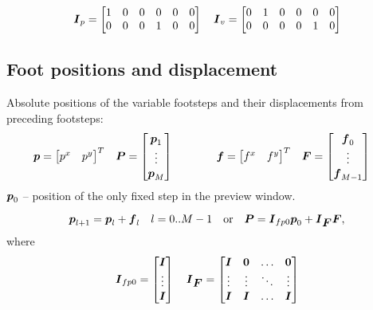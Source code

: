 \documentclass[12pt,a4paper]{article}
\begin{document}
\begin{equation*}
\mbox{\boldmath $I$}_{p} = 
\begin{bmatrix} 
    1 & 0 & 0 & 0 & 0 & 0 \\
    0 & 0 & 0 & 1 & 0 & 0 
\end{bmatrix}
\quad
\mbox{\boldmath $I$}_{v} = 
\begin{bmatrix} 
    0 & 1 & 0 & 0 & 0 & 0 \\
    0 & 0 & 0 & 0 & 1 & 0 
\end{bmatrix}
\end{equation*}



\subsection{Foot positions and displacement}
Absolute positions of the variable footsteps and their displacements from
preceding footsteps:
\begin{align*}
\mbox{\boldmath $p$} = \begin{bmatrix} p^x & p^y \end{bmatrix}^T
\quad &
\mbox{\boldmath $P$} = \begin{bmatrix} \mbox{\boldmath $p$}_1 \\ \vdots \\ \mbox{\boldmath $p$}_M \end{bmatrix}
\quad\quad\quad&
\mbox{\boldmath $f$} = \begin{bmatrix} f^x & f^y \end{bmatrix}^T
\quad &
\mbox{\boldmath $F$} = \begin{bmatrix} \mbox{\boldmath $f$}_0 \\ \vdots \\ \mbox{\boldmath $f$}_{M-1} \end{bmatrix}
\end{align*}
$\mbox{\boldmath $p$}_0$ -- position of the only fixed step in the preview window.


\begin{equation*}
    \mbox{\boldmath $p$}_{l+1} = \mbox{\boldmath $p$}_l + \mbox{\boldmath $f$}_{l}
    \quad
    l = 0..M-1
    \quad
    \mbox{or}
    \quad
    \mbox{\boldmath $P$} = 
    \mbox{\boldmath $I$}_{fp0}
    \mbox{\boldmath $p$}_0 
    + 
    \mbox{\boldmath $I$}_{\mbox{\boldmath $F$}}
    \mbox{\boldmath $F$},
\end{equation*}
where
\begin{equation*}
    \mbox{\boldmath $I$}_{fp0} = 
    \begin{bmatrix}
        \mbox{\boldmath $I$}\\
        \vdots\\
        \mbox{\boldmath $I$}\\
    \end{bmatrix}
    \quad
    \mbox{\boldmath $I$}_{\mbox{\boldmath $F$}} = 
    \begin{bmatrix}
        \mbox{\boldmath $I$}   &   \mbox{\boldmath $0$}   & \dots     & \mbox{\boldmath $0$} \\
        \vdots  &   \vdots  & \ddots    & \vdots \\
        \mbox{\boldmath $I$}   &   \mbox{\boldmath $I$}   & \dots     & \mbox{\boldmath $I$} \\
    \end{bmatrix}
\end{equation*}
\end{document}
